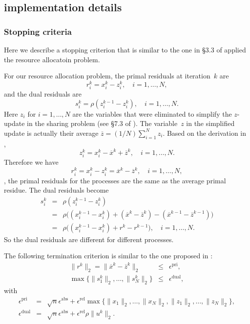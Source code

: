 \subsection{implementation details}

\subsubsection{Stopping criteria}
Here we describe a stopping criterion that is similar to the one
in \S3.3 of \cite{ADMM} applied the resource allocatoin problem.

For our resource allocation problem, the primal residuals at iteration~$k$ are
\[
    r_i^k = x_i^k - z_i^k, \quad i=1,\ldots,N,
\]
and the dual residuals are
\[
    s_i^k = \rho (z_i^{k-1}-z_i^{k}), \quad i=1,\ldots,N.
\]
Here $z_i$ for $i=1,\ldots, N$ are the variables that were eliminated
to simplify the $z$-update in the sharing problem 
(see \S7.3 of \cite{ADMM}).
The variable~$z$ in the  simplified update is actually 
their average $\overline z=(1/N)\sum_{i=1}^N z_i$.
Based on the derivation in \cite[\S7.3]{ADMM}, 
\[
    z_i^k = x_i^k -\overline x^k + \overline z^k , \quad i=1,\ldots,N.
\]
Therefore we have
\[
    r_i^k = x_i^k - z_i^k = \overline x^k - \overline z^k, \quad i=1,\ldots,N,
\]
\ie, the primal residuals for the processes are the same as the average
primal residue.
The dual residuals become
\begin{eqnarray*}
    s_i^k &=& \rho(z_i^{k-1} - z_i^k) \\
    &=&\rho\bigl( (x_i^{k-1}-x_i^k) +(\overline x^k-\overline z^k)
    -(\overline x^{k-1} - \overline z^{k-1})\bigr)\\
    &=& \rho\bigl( (x_i^{k-1}-x_i^k) + r^k - r^{k-1} \bigr),
    \quad i=1,\ldots, N.
\end{eqnarray*}
So the dual residuals are different for different processes.

The following termination criterion is similar to the one proposed in
\cite[\S3.3]{ADMM}:
\begin{eqnarray*}
\|r^k\|_2 = \|\overline x^k - \overline z^k\|_2 &\leq& \epsilon^\mathrm{pri},\\
\max \{\|s_1^k\|_2,\ldots,\|s_N^k\|_2 \} &\leq& \epsilon^\mathrm{dual},
\end{eqnarray*}
with
\begin{eqnarray*}
\epsilon^\mathrm{pri} &=& \sqrt{n}\epsilon^\mathrm{abs} + \epsilon^\mathrm{rel}
    \max\{\|x_1\|_2,\ldots,\|x_N\|_2,\|z_1\|_2,\ldots,\|z_N\|_2\} ,\\
\epsilon^\mathrm{dual} &=& \sqrt{n}\epsilon^\mathrm{abs} +\epsilon^\mathrm{rel}
    \rho\|u^k\|_2.
\end{eqnarray*}


